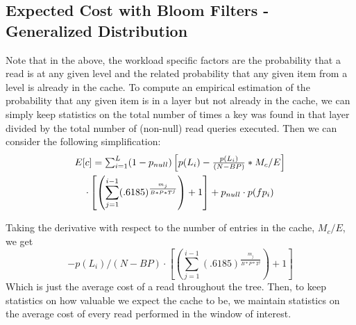 \documentclass{sig-alternate-05-2015}
\begin{document}
%

\subsection{Expected Cost with Bloom Filters - Generalized Distribution}
Note that in the above, the workload specific factors are the probability that a read is at any given level and the related probability that any given item from a level is already in the cache. To compute an empirical estimation of the probability that any given item is in a layer but not already in the cache, we can simply keep statistics on the total number of times a key was found in that layer divided by the total number of (non-null) read queries executed. Then we can consider the following simplification:
\begin{multline}
$$E[c] = \sum_{i=1}^{L} (1-p_{null})\left[p(L_i) - \frac{p(L_i)}{(N - BP)} * M_c/E \right]\\ \cdot \left[ \left(\sum_{j=1}^{i-1} (.6185) ^  {\frac{m_j}{B*P*T^j}}\right) +1 \right] + p_{null} \cdot p(fp_i) $$
\end{multline}

Taking the derivative with respect to the number of entries in the cache, $M_c/E$, we get 
$$
- p(L_i)/(N - BP) \cdot \left[ \left(\sum_{j=1}^{i-1} (.6185) ^  {\frac{m_j}{B*P*T^j}}\right) +1 \right]
$$
Which is just the average cost of a read throughout the tree. Then, to keep statistics on how valuable we expect the cache to be, we maintain statistics on the average cost of every read performed in the window of interest.
\end{document}
